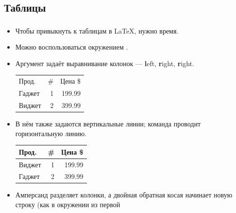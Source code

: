 \documentclass{beamer}
\begin{document}
\subsection{Таблицы}

\begin{frame}[fragile]
\frametitle{\insertsubsection}
\vspace{-3ex}
\begin{itemize}\small
\item Чтобы привыкнуть к таблицам в \LaTeX{}, нужно время.
\item Можно воспользоваться окружением .
\item Аргумент задаёт выравнивание колонок --- \textbf{l}eft, \textbf{r}ight, \textbf{r}ight.
\begin{exampletwouptiny}
\begin{tabular}{lrr}
Прод.  & \# & Цена \$ \\
Гаджет & 1  & 199.99  \\
Виджет & 2  & 399.99  \\
\end{tabular}
\end{exampletwouptiny}
\vspace{-1ex}
\item В нём также задаются вертикальные линии; команда  проводит горизонтальную линию.
\begin{exampletwouptiny}
\begin{tabular}{|l|r|r|} \hline
Прод.  & \# & Цена \$ \\\hline
Виджет & 1  & 199.99  \\
Гаджет & 2  & 399.99  \\\hline
\end{tabular}
\end{exampletwouptiny}
\item Амперсанд \keystrokebftt{\&} разделяет колонки, а двойная обратная косая
  \keystrokebftt{\bs}\keystrokebftt{\bs} начинает новую строку (как в окружении
   из первой 
\end{itemize}
\end{frame}

\end{document}
